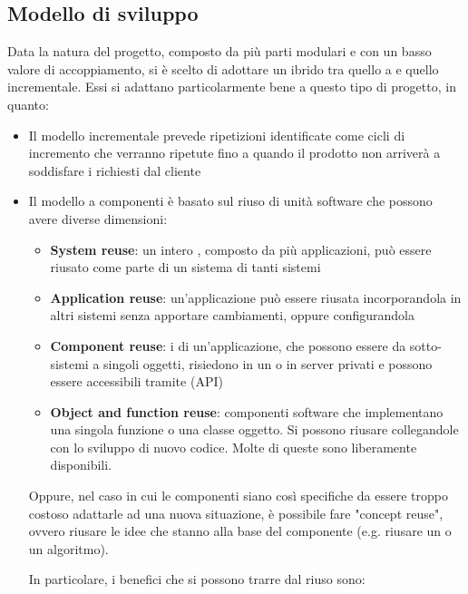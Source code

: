 	\subsection{Modello di sviluppo} %
	Data la natura del progetto, composto da più parti modulari e con un basso valore di accoppiamento, si è scelto di adottare un  ibrido tra quello a  e quello incrementale.
	Essi si adattano particolarmente bene a questo tipo di progetto, in quanto:
	\begin{itemize}
		\item Il modello incrementale prevede ripetizioni identificate come cicli di incremento che verranno ripetute fino a quando il prodotto non arriverà a soddisfare i  richiesti dal cliente
		\item Il modello a componenti è basato sul riuso di unità software che possono avere diverse dimensioni:
		\begin{itemize}
			\item \textbf{System reuse}: un intero , composto da più applicazioni, può essere riusato come parte di un sistema di tanti sistemi %
			\item \textbf{Application reuse}: un'applicazione può essere riusata incorporandola in altri sistemi senza apportare cambiamenti, 
				oppure configurandola
			\item \textbf{Component reuse}: i  di un'applicazione, che possono essere da sotto-sistemi a singoli oggetti, risiedono
				in un  o in server privati e possono essere accessibili tramite  (API)
			\item \textbf{Object and function reuse}: componenti software che implementano una singola funzione o una classe oggetto. Si 
				possono riusare collegandole con lo sviluppo di nuovo codice. Molte di queste sono liberamente disponibili. 
		\end{itemize}
		Oppure, nel caso in cui le componenti siano così specifiche da essere troppo costoso adattarle ad una nuova situazione,
		è possibile fare "concept reuse", ovvero riusare le idee che stanno alla base del componente (e.g. riusare un  o un algoritmo). \par
		In particolare, i benefici che si possono trarre dal riuso sono:
		\begin{itemize}

\end{itemize}
\end{itemize}
